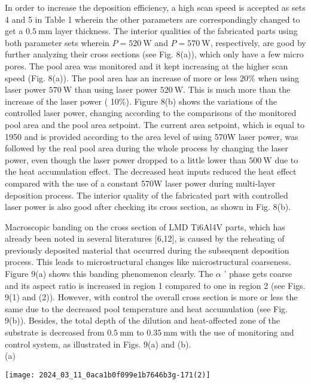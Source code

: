 \documentclass[10pt]{article}
\begin{document}
In order to increase the deposition efficiency, a high scan speed is accepted as sets 4 and 5 in Table 1 wherein the other parameters are correspondingly changed to get a $0.5 \mathrm{~mm}$ layer thickness. The interior qualities of the fabricated parts using both parameter sets wherein $P=520 \mathrm{~W}$ and $P=570 \mathrm{~W}$, respectively, are good by further analyzing their cross sections (see Fig. 8(a)), which only have a few micro pores. The pool area was monitored and it kept increasing at the higher scan speed (Fig. 8(a)). The pool area has an increase of more or less $20 \%$ when using laser power $570 \mathrm{~W}$ than using laser power $520 \mathrm{~W}$. This is much more than the increase of the laser power ( 10\%). Figure 8(b) shows the variations of the controlled laser power, changing according to the comparisons of the monitored pool area and the pool area setpoint. The current area setpoint, which is equal to 1950 and is provided according to the area level of using 570W laser power, was followed by the real pool area during the whole process by changing the laser power, even though the laser power dropped to a little lower than $500 \mathrm{~W}$ due to the heat accumulation effect. The decreased heat inputs reduced the heat effect compared with the use of a constant 570W laser power during multi-layer deposition process. The interior quality of the fabricated part with controlled laser power is also good after checking its cross section, as shown in Fig. 8(b).

Macroscopic banding on the cross section of LMD Ti6Al4V parts, which has already been noted in several literatures [6,12], is caused by the reheating of previously deposited material that occurred during the subsequent deposition process. This leads to microstructural changes like microstructural coarseness. Figure 9(a) shows this banding phenomenon clearly. The $\alpha$ ' phase gets coarse and its aspect ratio is increased in region 1 compared to one in region 2 (see Figs. 9(1) and (2)). However, with control the overall cross section is more or less the same due to the decreased pool temperature and heat accumulation (see Fig. 9(b)). Besides, the total depth of the dilution and heat-affected zone of the substrate is decreased from $0.5 \mathrm{~mm}$ to $0.35 \mathrm{~mm}$ with the use of monitoring and control system, as illustrated in Figs. 9(a) and (b).\\
(a)

\begin{center}
\texttt{[image: 2024\_03\_11\_0aca1b0f099e1b7646b3g-171(2)]}
\end{center}
\end{document}
